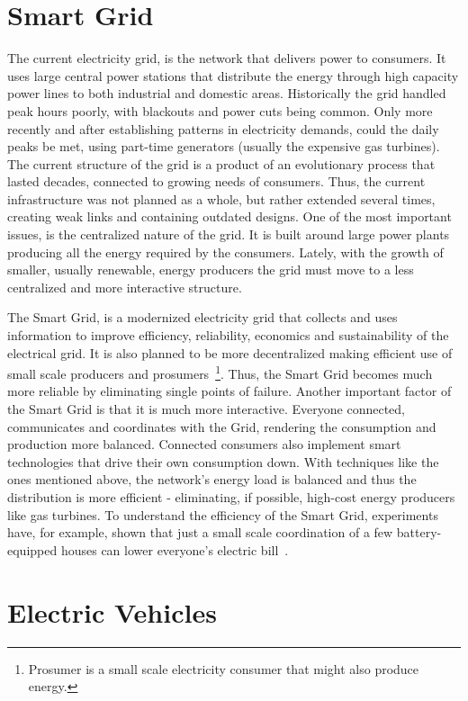 \section{Smart Grid}
The current electricity grid, is the network that delivers power to consumers. It uses large central power stations that distribute the energy through high capacity power lines to both industrial and domestic areas. Historically the grid handled peak hours poorly, with blackouts and power cuts being common. Only more recently and after establishing patterns in electricity demands, could the daily peaks be met, using part-time generators (usually the expensive gas turbines). The current structure of the grid is a product of an evolutionary process that lasted decades, connected to growing needs of consumers. Thus, the current infrastructure was not planned as a whole, but rather extended several times, creating weak links and containing outdated designs. One of the most important issues, is the centralized nature of the grid. It is built around large power plants producing all the energy required by the consumers. Lately, with the growth of smaller, usually renewable, energy producers the grid must move to a less centralized and more interactive structure.

The Smart Grid, is a modernized electricity grid that collects and uses information to improve efficiency, reliability, economics and sustainability of the electrical grid. It is also planned to be more decentralized making efficient use of small scale producers and prosumers~\footnote{Prosumer is a small scale electricity consumer that might also produce energy\cite{lampropoulos2010methodology}.}. Thus, the Smart Grid becomes much more reliable by eliminating single points of failure. Another important factor of the Smart Grid is that it is much more interactive. Everyone connected, communicates and coordinates with the Grid, rendering the consumption and production more balanced. Connected consumers also implement smart technologies that drive their own consumption down. With techniques like the ones mentioned above, the network's energy load is balanced and thus the distribution is more efficient - eliminating, if possible, high-cost energy producers like gas turbines. To understand the efficiency of the Smart Grid, experiments have, for example, shown that just a small scale coordination of a few battery-equipped houses can lower everyone's electric bill~\cite{vytelingum2010agent}.
\section{Electric Vehicles}

